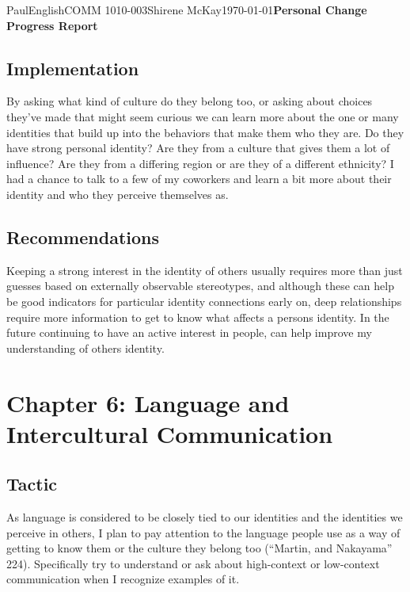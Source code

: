 \documentclass[12pt,letterpaper]{article}
\begin{document}
\begin{mla}{Paul}{English}{COMM 1010-003}{Shirene
    McKay}{\today}{\textbf{Personal Change Progress Report}}
\subsection{Implementation}
By asking what kind of culture do they belong too, or asking about
choices they've made that might seem curious we can learn more about
the one or many identities that build up into the behaviors that make
them who they are. Do they have strong personal identity? Are they
from a culture that gives them a lot of influence? Are they from a
differing region or are they of a different ethnicity? I had a chance to talk to a few of my coworkers and learn a bit more about their identity and who they perceive themselves as.

\subsection{Recommendations}
Keeping a strong interest in the identity of others usually requires
more than just guesses based on externally observable stereotypes, and
although these can help be good indicators for particular identity
connections early on, deep relationships require more information to
get to know what affects a persons identity. In the future continuing
to have an active interest in people, can help improve my
understanding of others identity.

\section{Chapter 6: Language and Intercultural Communication}
\subsection{Tactic}
As language is considered to be closely tied to our identities and the identities we perceive in others, I plan to pay attention to the language people use as a way of getting to know
them or the culture they belong too (``Martin, and Nakayama'' 224). Specifically try to understand or
ask about high-context or low-context communication when I recognize
examples of it.


\end{mla}
\end{document}
